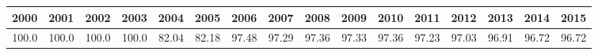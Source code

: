 \begin{tabular}{rrrrrrrrrrrrrrrr}
\hline\hline
\textbf{2000} & \textbf{2001} & \textbf{2002} & \textbf{2003} & \textbf{2004} & \textbf{2005} & \textbf{2006} & \textbf{2007} & \textbf{2008} & \textbf{2009} & \textbf{2010} & \textbf{2011} & \textbf{2012} & \textbf{2013} & \textbf{2014} & \textbf{2015} \\\hline
100.0 & 100.0 & 100.0 & 100.0 & 82.04 & 82.18 & 97.48 & 97.29 & 97.36 & 97.33 & 97.36 & 97.23 & 97.03 & 96.91 & 96.72 & 96.72 \\\hline\hline
\end{tabular}
